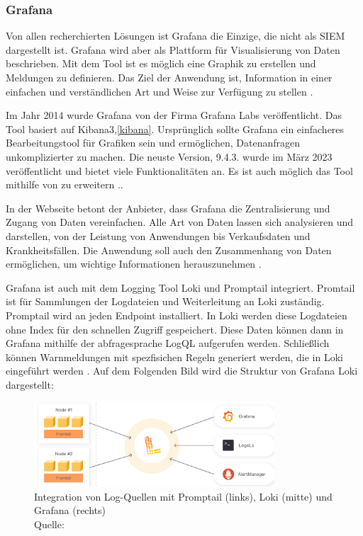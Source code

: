 \subsubsection{Grafana}
Von allen recherchierten Lösungen ist Grafana die Einzige, die nicht als \gls{SIEM} dargestellt ist. Grafana wird aber als Plattform für Visualisierung von Daten beschrieben. Mit dem Tool ist es möglich eine Graphik zu erstellen und Meldungen zu definieren. Das Ziel der Anwendung ist, Information in einer einfachen und verständlichen Art und Weise zur Verfügung zu stellen \citep{redhat_grafana}.  

Im Jahr 2014 wurde Grafana von der Firma Grafana Labs veröffentlicht. Das Tool basiert auf Kibana3,\ref{kibana}. Ursprünglich sollte Grafana ein einfacheres Bearbeitungstool für Grafiken sein und ermöglichen, Datenanfragen unkomplizierter zu machen. Die neuste Version, 9.4.3. wurde im März 2023 veröffentlicht und bietet viele Funktionalitäten an. Es ist auch möglich das Tool mithilfe von   zu erweitern \citep{Oedegaard_historyGrafana}.. 

In der Webseite betont der Anbieter, dass Grafana die Zentralisierung und Zugang von Daten vereinfachen. Alle Art von Daten lassen sich analysieren und darstellen, von der Leistung von Anwendungen bis Verkaufsdaten und Krankheitsfällen. Die Anwendung soll auch den Zusammenhang von Daten ermöglichen, um wichtige Informationen herauszunehmen \citep{Grafana_Grafana}.

Grafana ist auch mit dem Logging Tool Loki und Promptail integriert. Promtail ist für Sammlungen der Logdateien und Weiterleitung an Loki zuständig. Promptail wird an jeden \gls{Endpoint} installiert. In Loki werden diese Logdateien ohne Index für den schnellen Zugriff gespeichert. Diese Daten können dann in Grafana mithilfe der \gls{abfragesprache} LogQL aufgerufen werden. Schließlich können Warnmeldungen mit spezfisichen Regeln generiert werden, die in Loki eingeführt werden \citep{Grafana_loki}. Auf dem Folgenden Bild wird die Struktur von Grafana Loki  dargestellt:

\begin{figure}[H]
   \centering
   \includegraphics[width=0.8\textwidth]{assets/2_p10.png}
   \caption[Integration von Log-Quellen mit Promptail, Loki und Grafana]
   {Integration von Log-Quellen mit Promptail (links), Loki (mitte) und Grafana (rechts) \\Quelle: \citep{Grafana_Logs}}
   \centering
\end{figure}

